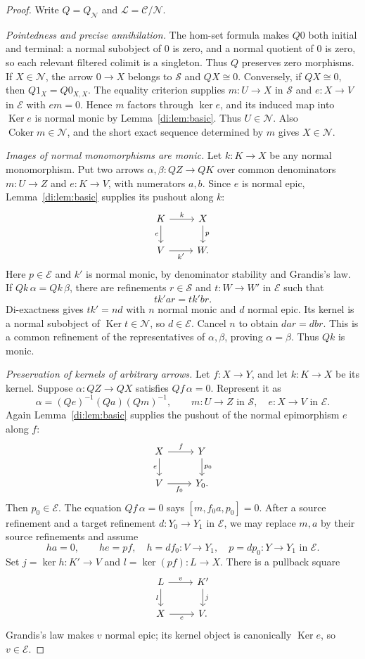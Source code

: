 \documentclass[11pt,reqno,a4paper]{amsart}
\theoremstyle{definition}
\theoremstyle{remark}
\newcommand{\C}{\mathcal{C}}
\newcommand{\N}{\mathcal{N}}
\newcommand{\0}{\mathbf{0}}
\renewcommand{\1}{\mathbf{1}}
\DeclareMathOperator{\Ker}{Ker}
\DeclareMathOperator{\Coker}{Coker}
\newcommand{\Sden}{\mathcal S}
\newcommand{\Eden}{\mathcal E}
\newcommand{\Loc}{\mathcal L}
\begin{document}
\begin{proof}
Write $Q=Q_{\N}$ and $\Loc=\C/\N$.

\smallskip\noindent\emph{Pointedness and precise annihilation.}
The hom-set formula makes $Q0$ both initial and terminal: a normal subobject of $0$ is zero, and a normal quotient of $0$ is zero, so each relevant filtered colimit is a singleton. Thus $Q$ preserves zero morphisms. If $X\in\N$, the arrow $0\to X$ belongs to $\Sden$ and $QX\cong0$. Conversely, if $QX\cong0$, then $Q1_X=Q0_{X,X}$. The equality criterion supplies $m:U\to X$ in $\Sden$ and $e:X\to V$ in $\Eden$ with $em=0$. Hence $m$ factors through $\ker e$, and its induced map into $\Ker e$ is normal monic by Lemma~\ref{di:lem:basic}. Thus $U\in\N$. Also $\Coker m\in\N$, and the short exact sequence determined by $m$ gives $X\in\N$.

\smallskip\noindent\emph{Images of normal monomorphisms are monic.}
Let $k:K\to X$ be any normal monomorphism. Put two arrows $\alpha,\beta:QZ\to QK$ over common denominators $m:U\to Z$ and $e:K\to V$, with numerators $a,b$. Since $e$ is normal epic, Lemma~\ref{di:lem:basic} supplies its pushout along $k$:
\[
\begin{tikzcd}
K\arrow[r,"k"]\arrow[d,"e"']&X\arrow[d,"p"]\\
V\arrow[r,"k'"']&W.
\end{tikzcd}
\]
Here $p\in\Eden$ and $k'$ is normal monic, by denominator stability and Grandis's law. If $Qk\,\alpha=Qk\,\beta$, there are refinements $r\in\Sden$ and $t:W\to W'$ in $\Eden$ such that
\[
 tk'ar=tk'br.
\]
Di-exactness gives $tk'=nd$ with $n$ normal monic and $d$ normal epic. Its kernel is a normal subobject of $\Ker t\in\N$, so $d\in\Eden$. Cancel $n$ to obtain $dar=dbr$. This is a common refinement of the representatives of $\alpha,\beta$, proving $\alpha=\beta$. Thus $Qk$ is monic.

\smallskip\noindent\emph{Preservation of kernels of arbitrary arrows.}
Let $f:X\to Y$, and let $k:K\to X$ be its kernel. Suppose $\alpha:QZ\to QX$ satisfies $Qf\,\alpha=0$. Represent it as
\[
 \alpha=(Qe)^{-1}(Qa)(Qm)^{-1},\qquad
 m:U\to Z\text{ in }\Sden,\quad e:X\to V\text{ in }\Eden.
\]
Again Lemma~\ref{di:lem:basic} supplies the pushout of the normal epimorphism $e$ along $f$:
\[
\begin{tikzcd}
X\arrow[r,"f"]\arrow[d,"e"']&Y\arrow[d,"p_0"]\\
V\arrow[r,"f_0"']&Y_0.
\end{tikzcd}
\]
Then $p_0\in\Eden$. The equation $Qf\,\alpha=0$ says $[m,f_0a,p_0]=0$. After a source refinement and a target refinement $d:Y_0\to Y_1$ in $\Eden$, we may replace $m,a$ by their source refinements and assume
\[
 h a=0,\qquad h e=p f,
 \quad h=df_0:V\to Y_1,\quad p=dp_0:Y\to Y_1\text{ in }\Eden.
\]
Set $j=\ker h:K'\to V$ and $l=\ker(pf):L\to X$. There is a pullback square
\[
\begin{tikzcd}
L\arrow[r,"v"]\arrow[d,"l"']&K'\arrow[d,"j"]\\
X\arrow[r,"e"']&V.
\end{tikzcd}
\]
Grandis's law makes $v$ normal epic; its kernel object is canonically $\Ker e$, so $v\in\Eden$.


\end{proof}
\end{document}
